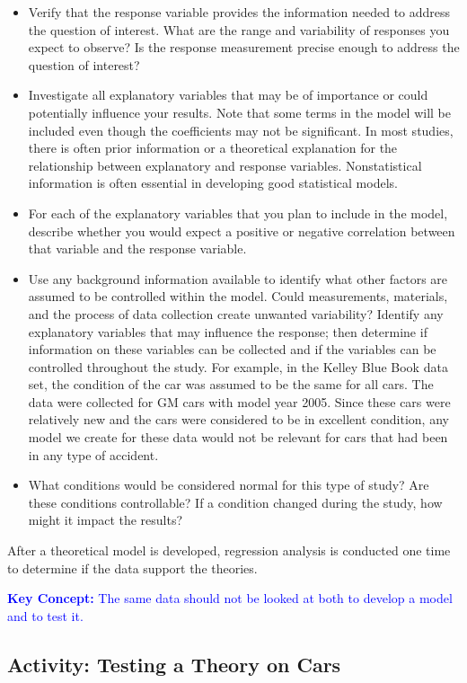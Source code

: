 \documentclass[
]{book}
\begin{document}
\begin{itemize}
\item
  Verify that the response variable provides the information needed to address the question of interest. What are the range and variability of responses you expect to observe? Is the response measurement precise enough to address the question of interest?
\item
  Investigate all explanatory variables that may be of importance or could potentially influence your results. Note that some terms in the model will be included even though the coefficients may not be significant. In most studies, there is often prior information or a theoretical explanation for the relationship between explanatory and response variables. Nonstatistical information is often essential in developing good statistical models.
\item
  For each of the explanatory variables that you plan to include in the model, describe whether you would expect a positive or negative correlation between that variable and the response variable.
\item
  Use any background information available to identify what other factors are assumed to be controlled within the model. Could measurements, materials, and the process of data collection create unwanted variability? Identify any explanatory variables that may influence the response; then determine if information on these variables can be collected and if the variables can be controlled throughout the study. For example, in the Kelley Blue Book data set, the condition of the car was assumed to be the same for all cars. The data were collected for GM cars with model year 2005. Since these cars were relatively new and the cars were considered to be in excellent condition, any model we create for these data would not be relevant for cars that had been in any type of accident.
\item
  What conditions would be considered normal for this type of study? Are these conditions controllable? If a condition changed during the study, how might it impact the results?
\end{itemize}

After a theoretical model is developed, regression analysis is conducted one time to determine if the data support the theories.

\textbf{\textcolor{blue}{Key Concept:}}
\textcolor{blue}{The same data should not be looked at both to develop a model and to test it.}

\hypertarget{activity-testing-a-theory-on-cars}{%
\subsection*{Activity: Testing a Theory on Cars}\label{activity-testing-a-theory-on-cars}}
\end{document}
